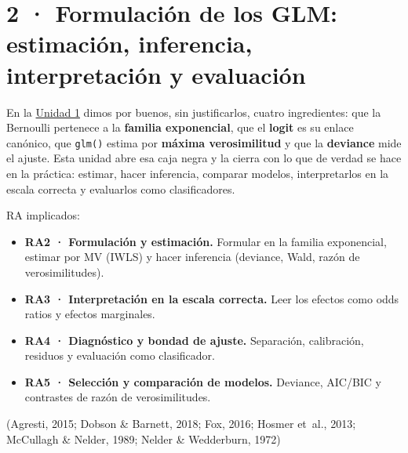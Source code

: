 \documentclass[
  letterpaper,
  DIV=11,
  numbers=noendperiod]{scrartcl}
\providecommand{\tightlist}{%
  \setlength{\itemsep}{0pt}\setlength{\parskip}{0pt}}\usepackage{longtable,booktabs,array}
\begin{document}
\hypertarget{sec-u12}{%
\section{2 · Formulación de los GLM: estimación, inferencia,
interpretación y evaluación}\label{sec-u12}}

En la \protect\hyperlink{sec-u11}{Unidad 1} dimos por buenos, sin
justificarlos, cuatro ingredientes: que la Bernoulli pertenece a la
\textbf{familia exponencial}, que el \textbf{logit} es su enlace
canónico, que \texttt{glm()} estima por \textbf{máxima verosimilitud} y
que la \textbf{deviance} mide el ajuste. Esta unidad abre esa caja negra
y la cierra con lo que de verdad se hace en la práctica: estimar, hacer
inferencia, comparar modelos, interpretarlos en la escala correcta y
evaluarlos como clasificadores.

\begin{tcolorbox}[enhanced jigsaw, coltitle=black, rightrule=.15mm, arc=.35mm, leftrule=.75mm, colback=white, colbacktitle=quarto-callout-note-color!10!white, left=2mm, breakable, toptitle=1mm, toprule=.15mm, bottomtitle=1mm, titlerule=0mm, title=\textcolor{quarto-callout-note-color}{\faInfo}\hspace{0.5em}{Sobre esta unidad}, bottomrule=.15mm, opacityback=0, opacitybacktitle=0.6, colframe=quarto-callout-note-color-frame]

RA implicados:

\begin{itemize}
\tightlist
\item
  \textbf{RA2 · Formulación y estimación.} Formular en la familia
  exponencial, estimar por MV (IWLS) y hacer inferencia (deviance, Wald,
  razón de verosimilitudes).
\item
  \textbf{RA3 · Interpretación en la escala correcta.} Leer los efectos
  como odds ratios y efectos marginales.
\item
  \textbf{RA4 · Diagnóstico y bondad de ajuste.} Separación,
  calibración, residuos y evaluación como clasificador.
\item
  \textbf{RA5 · Selección y comparación de modelos.} Deviance, AIC/BIC y
  contrastes de razón de verosimilitudes.
\end{itemize}

(Agresti, 2015; Dobson \& Barnett, 2018; Fox, 2016; Hosmer et~al., 2013;
McCullagh \& Nelder, 1989; Nelder \& Wedderburn, 1972)

\end{tcolorbox}
\end{document}
